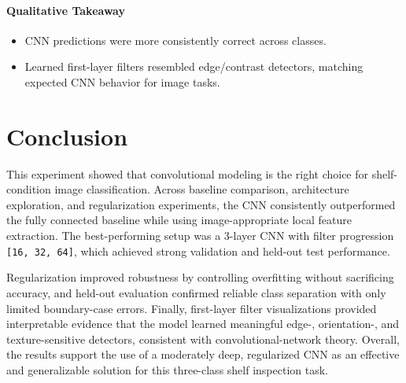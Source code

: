 \documentclass[10pt,twocolumn]{article}
\begin{document}
\paragraph{Qualitative Takeaway}
\begin{itemize}
	\item CNN predictions were more consistently correct across classes.
	\item Learned first-layer filters resembled edge/contrast detectors, matching expected CNN behavior for image tasks.
\end{itemize}

\section{Conclusion}
This experiment showed that convolutional modeling is the right choice for shelf-condition image classification. Across baseline comparison, architecture exploration, and regularization experiments, the CNN consistently outperformed the fully connected baseline while using image-appropriate local feature extraction. The best-performing setup was a 3-layer CNN with filter progression \texttt{[16, 32, 64]}, which achieved strong validation and held-out test performance.

Regularization improved robustness by controlling overfitting without sacrificing accuracy, and held-out evaluation confirmed reliable class separation with only limited boundary-case errors. Finally, first-layer filter visualizations provided interpretable evidence that the model learned meaningful edge-, orientation-, and texture-sensitive detectors, consistent with convolutional-network theory. Overall, the results support the use of a moderately deep, regularized CNN as an effective and generalizable solution for this three-class shelf inspection task.


\nocite{*}




\end{document}
